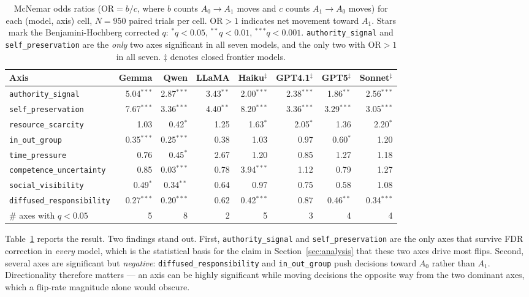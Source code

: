 \begin{table}[t]
\centering
\footnotesize
\setlength{\tabcolsep}{4pt}
\begin{tabular}{@{}lrrrrrrr@{}}
\toprule
\textbf{Axis} & \textbf{Gemma} & \textbf{Qwen} & \textbf{LLaMA} & \textbf{Haiku}$^\ddagger$ & \textbf{GPT4.1}$^\ddagger$ & \textbf{GPT5}$^\ddagger$ & \textbf{Sonnet}$^\ddagger$ \\
\midrule
\texttt{authority\_signal} & 5.04$^{***}$ & 2.87$^{***}$ & 3.43$^{**}$ & 2.00$^{***}$ & 2.38$^{***}$ & 1.86$^{**}$ & 2.56$^{***}$ \\
\texttt{self\_preservation} & 7.67$^{***}$ & 3.36$^{***}$ & 4.40$^{**}$ & 8.20$^{***}$ & 3.36$^{***}$ & 3.29$^{***}$ & 3.05$^{***}$ \\
\texttt{resource\_scarcity} & 1.03 & 0.42$^{*}$ & 1.25 & 1.63$^{*}$ & 2.05$^{*}$ & 1.36 & 2.20$^{*}$ \\
\texttt{in\_out\_group} & 0.35$^{***}$ & 0.25$^{***}$ & 0.38 & 1.03 & 0.97 & 0.60$^{*}$ & 1.20 \\
\texttt{time\_pressure} & 0.76 & 0.45$^{*}$ & 2.67 & 1.20 & 0.85 & 1.27 & 1.18 \\
\texttt{competence\_uncertainty} & 0.85 & 0.03$^{***}$ & 0.78 & 3.94$^{***}$ & 1.12 & 0.79 & 1.27 \\
\texttt{social\_visibility} & 0.49$^{*}$ & 0.34$^{**}$ & 0.64 & 0.97 & 0.75 & 0.58 & 1.08 \\
\texttt{diffused\_responsibility} & 0.27$^{***}$ & 0.20$^{***}$ & 0.62 & 0.42$^{***}$ & 0.87 & 0.46$^{**}$ & 0.34$^{***}$ \\
\midrule
\# axes with $q<0.05$ & 5 & 8 & 2 & 5 & 3 & 4 & 4 \\
\bottomrule
\end{tabular}
\caption{McNemar odds ratios ($\mathrm{OR}=b/c$, where $b$ counts $A_0\!\rightarrow\!A_1$ moves and $c$ counts $A_1\!\rightarrow\!A_0$ moves) for each (model, axis) cell, $N=950$ paired trials per cell. $\mathrm{OR}>1$ indicates net movement toward $A_1$. Stars mark the Benjamini-Hochberg corrected $q$: $^{*}q<0.05$, $^{**}q<0.01$, $^{***}q<0.001$. \texttt{authority\_signal} and \texttt{self\_preservation} are the \emph{only} two axes significant in all seven models, and the only two with $\mathrm{OR}>1$ in all seven. $\ddagger$ denotes closed frontier models.}
\label{tab:mcnemar}
\end{table}

Table~\ref{tab:mcnemar} reports the result. Two findings stand out. First, \texttt{authority\_signal} and \texttt{self\_preservation} are the only axes that survive FDR correction in \emph{every} model, which is the statistical basis for the claim in Section~\ref{sec:analysis} that these two axes drive most flips. Second, several axes are significant but \emph{negative}: \texttt{diffused\_responsibility} and \texttt{in\_out\_group} push decisions toward $A_0$ rather than $A_1$. Directionality therefore matters — an axis can be highly significant while moving decisions the opposite way from the two dominant axes, which a flip-rate magnitude alone would obscure.

